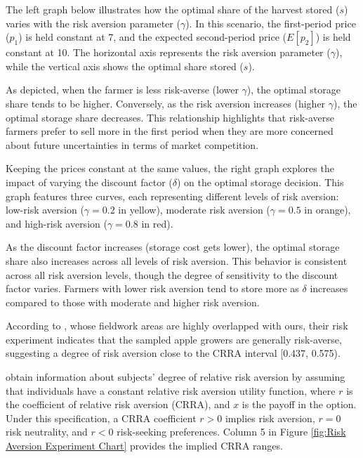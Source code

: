 \documentclass[12pt]{article}
\begin{document}
The left graph below illustrates how the optimal share of the harvest stored (\( s \)) varies with the risk aversion parameter (\( \gamma \)). In this scenario, the first-period price (\( p_1 \)) is held constant at 7, and the expected second-period price (\( E[p_2] \)) is held constant at 10. The horizontal axis represents the risk aversion parameter (\( \gamma \)), while the vertical axis shows the optimal share stored (\( s \)).

As depicted, when the farmer is less risk-averse (lower \( \gamma \)), the optimal storage share tends to be higher. Conversely, as the risk aversion increases (higher \( \gamma \)), the optimal storage share decreases. This relationship highlights that risk-averse farmers prefer to sell more in the first period when they are more concerned about future uncertainties in terms of market competition.


Keeping the prices constant at the same values, the right graph explores the impact of varying the discount factor (\( \delta \)) on the optimal storage decision. This graph features three curves, each representing different levels of risk aversion: low-risk aversion (\( \gamma = 0.2 \) in yellow), moderate risk aversion (\( \gamma = 0.5 \) in orange), and high-risk aversion (\( \gamma = 0.8 \) in red).

As the discount factor increases (storage cost gets lower), the optimal storage share also increases across all levels of risk aversion. This behavior is consistent across all risk aversion levels, though the degree of sensitivity to the discount factor varies. Farmers with lower risk aversion tend to store more as \(\delta\) increases compared to those with moderate and higher risk aversion.


According to \cite{jin2024losses}, whose fieldwork areas are highly overlapped with ours, their risk experiment indicates that the sampled apple growers are generally risk-averse, suggesting a degree of risk aversion close to the CRRA interval [0.437, 0.575). 

\cite{jin2017farmers} obtain information about subjects’ degree of relative risk aversion by assuming that individuals have a constant relative risk aversion utility function, where $r$ is the coefficient of relative risk aversion (CRRA), and $x$ is the payoff in the option. Under this specification, a CRRA coefficient $r > 0$ implies risk aversion, $r = 0$ risk neutrality, and $r < 0$ risk-seeking preferences. Column 5 in Figure \ref{fig:Risk Aversion Experiment Chart} provides the implied CRRA ranges.
\end{document}
